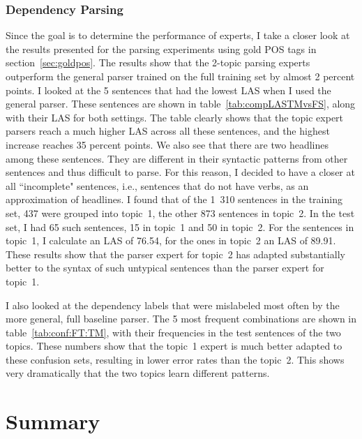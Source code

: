 \subsubsection{Dependency Parsing}

Since the goal is to determine the performance of experts, I take a closer look at the results presented for the parsing experiments using gold POS tags in  section~\ref{sec:goldpos}. The results show that the 2-topic parsing experts outperform the general parser trained on the full training set by almost 2 percent points.  I looked at the 5 sentences that had the lowest LAS when I used the general parser. These sentences are shown in table~\ref{tab:compLASTMvsFS}, along with their LAS for both settings. The table clearly shows that the topic expert parsers reach a much higher LAS across all these sentences, and the highest increase reaches 35 percent points. We also see that there are two headlines among these sentences. They are different in their syntactic patterns from other sentences and thus difficult to parse. For this reason, I decided to have a closer at all ``incomplete" sentences, i.e., sentences that do not have verbs, as an approximation of headlines. I found that of the 1~310 sentences in the training set, 437 were grouped into topic~1, the other 873 sentences in topic~2. In the test set, I had 65 such sentences, 15 in topic~1 and 50 in topic~2. For the sentences in topic~1, I calculate an LAS of 76.54, for the ones in topic~2 an LAS of 89.91. These results show that the parser expert for topic~2 has adapted substantially better to the syntax of such untypical sentences than the parser expert for topic~1. 

I also looked at the dependency labels that were mislabeled most often by the more general, full baseline parser. The 5 most frequent combinations are shown in table~\ref{tab:conf:FT:TM}, with their frequencies in the test sentences of the two topics. These numbers show that the topic~1 expert is much better adapted to these confusion sets, resulting in lower error rates than the topic~2. This shows very dramatically that the two topics learn different patterns.

\section{Summary}

